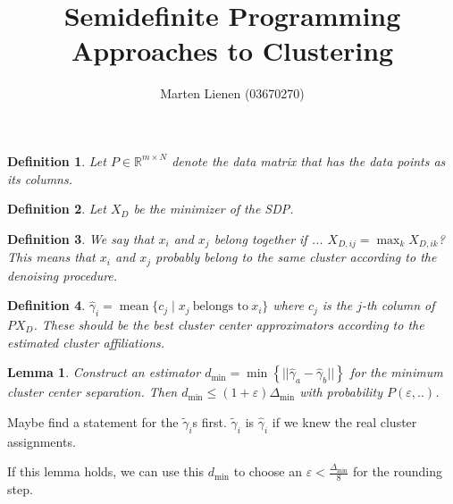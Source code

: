 \documentclass[10pt,a4paper]{article}
\title{Semidefinite Programming Approaches to Clustering}
\author{Marten Lienen (03670270)}
\date{}
\newtheorem{lemma}{Lemma}
\newtheorem{definition}{Definition}
\DeclareMathOperator{\mean}{mean}
\begin{document}
\maketitle

\begin{definition}
  Let $P \in \mathbb{R}^{m \times N}$ denote the data matrix that has the data points as its columns.
\end{definition}

\begin{definition}
  Let $X_{D}$ be the minimizer of the SDP.
\end{definition}

\begin{definition}
  We say that $x_{i}$ and $x_{j}$ \emph{belong together} if ... $X_{D,ij} = \max_{k} X_{D,ik}$?
  This means that $x_{i}$ and $x_{j}$ probably belong to the same cluster according to the denoising procedure.
\end{definition}

\begin{definition}
  $\hat{\gamma}_{i} = \mean \{ c_{j} \mid x_{j}~\text{belongs to}~x_{i} \}$ where $c_{j}$ is the $j$-th column of $PX_{D}$.
  These should be the best cluster center approximators according to the estimated cluster affiliations.
\end{definition}

\begin{lemma}
  Construct an estimator $d_{\min} = \min \left\{ ||\hat{\gamma}_{a} - \hat{\gamma}_{b}|| \right\}$ for the minimum cluster center separation.
  Then $d_{\min} \le (1 + \varepsilon) \Delta_{\min}$ with probability $P(\varepsilon, ..)$.
\end{lemma}

Maybe find a statement for the $\tilde{\gamma}_{i}$s first.
$\tilde{\gamma}_{i}$ is $\hat{\gamma}_{i}$ if we knew the real cluster assignments.

If this lemma holds, we can use this $d_{\min}$ to choose an $\varepsilon < \frac{\Delta_{\min}}{8}$ for the rounding step.
\end{document}
